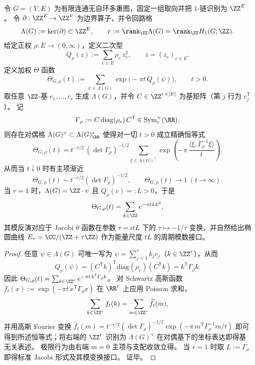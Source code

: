 
\begin{theorem}\label{thm:graph-cycle-lattice-theta-modular-inversion}
令 \(G=(V,E)\) 为有限连通无自环多重图，固定一组取向并把 \(1\)-链识别为 \(\ZZ^{E}\)。
令 \(\partial:\ZZ^{E}\to \ZZ^{V}\) 为边界算子，并令回路格
\[
\Lambda(G):=\ker(\partial)\subset \ZZ^{E},
\qquad
r:=\rank_{\ZZ}\Lambda(G)=\rank_{\ZZ}H_1(G;\ZZ).
\]
给定正权 \(\rho:E\to(0,\infty)\)，定义二次型
\[
Q_\rho(z):=\sum_{e\in E}\rho_e\,z_e^2,
\qquad z=(z_e)_{e\in E}.
\]
定义加权 \(\Theta\) 函数
\[
\Theta_{G,\rho}(t):=\sum_{\psi\in\Lambda(G)}\exp\!\bigl(-\pi t\,Q_\rho(\psi)\bigr),
\qquad t>0.
\]
取任意 \(\ZZ\)-基 \(c_1,\dots,c_r\) 生成 \(\Lambda(G)\)，并令 \(C\in\ZZ^{r\times |E|}\) 为基矩阵（第 \(j\) 行为 \(c_j^{\mathsf T}\)）。
记
\[
\Gamma_\rho:=C\,\mathrm{diag}(\rho_e)\,C^{\mathsf T}\in\mathrm{Sym}_r^+(\RR).
\]
则存在对偶格 \(\Lambda(G)^\vee\subset \Lambda(G)_{\RR}^\ast\) 使得对一切 \(t>0\) 成立精确恒等式
\[
\boxed{\;
\Theta_{G,\rho}(t)
=t^{-r/2}\,(\det\Gamma_\rho)^{-1/2}
\sum_{\xi\in \Lambda(G)^\vee}\exp\!\left(-\pi\,\frac{\langle\xi,\Gamma_\rho^{-1}\xi\rangle}{t}\right).
\;}
\]
从而当 \(t\downarrow 0\) 时有主项渐近
\[
\Theta_{G,\rho}(t)\sim t^{-r/2}(\det\Gamma_\rho)^{-1/2},
\qquad
\Theta_{G,\rho}(t)\to 1\ (t\to\infty).
\]
当 \(r=1\) 时，\(\Lambda(G)=\ZZ\cdot v\) 且 \(Q_\rho(v)=:L>0\)，于是
\[
\Theta_{G,\rho}(t)=\sum_{k\in\ZZ}e^{-\pi t L k^2},
\]
其模反演对应于 Jacobi \(\theta\) 函数在参数 \(\tau=i t L\) 下的 \(\tau\mapsto-1/\tau\) 变换，并自然给出椭圆曲线
\(
E_\tau=\CC/(\ZZ+\tau\ZZ)
\)
作为能量尺度 \(tL\) 的周期模数接口。
\end{theorem}
\begin{proof}
任意 \(\psi\in\Lambda(G)\) 可唯一写为 \(\psi=\sum_{j=1}^r k_j c_j\)（\(k\in\ZZ^r\)），从而
\[
Q_\rho(\psi)
=(C^{\mathsf T}k)^{\mathsf T}\mathrm{diag}(\rho_e)(C^{\mathsf T}k)
=k^{\mathsf T}\Gamma_\rho k.
\]
因此
\(
\Theta_{G,\rho}(t)=\sum_{k\in\ZZ^r}e^{-\pi t\,k^{\mathsf T}\Gamma_\rho k}
\)。
对 Schwartz 高斯函数 \(f_t(x):=\exp(-\pi t\,x^{\mathsf T}\Gamma_\rho x)\) 在 \(\RR^r\) 上应用 Poisson 求和，
\[
\sum_{k\in\ZZ^r}f_t(k)=\sum_{m\in\ZZ^r}\widehat f_t(m),
\]
并用高斯 Fourier 变换
\(
\widehat f_t(m)=t^{-r/2}(\det\Gamma_\rho)^{-1/2}\exp(-\pi\,m^{\mathsf T}\Gamma_\rho^{-1}m/t)
\)
即可得到所述恒等式；将右端的 \(\ZZ^r\) 识别为 \(\Lambda(G)^\vee\) 在对偶基下的坐标表达即得基无关表述。
极限行为由右端 \(m=0\) 主项与支配收敛立得。
当 \(r=1\) 时取 \(L:=\Gamma_\rho\) 即得标准 Jacobi 形式及其模变换接口。
证毕。
\end{proof}

\endinput

